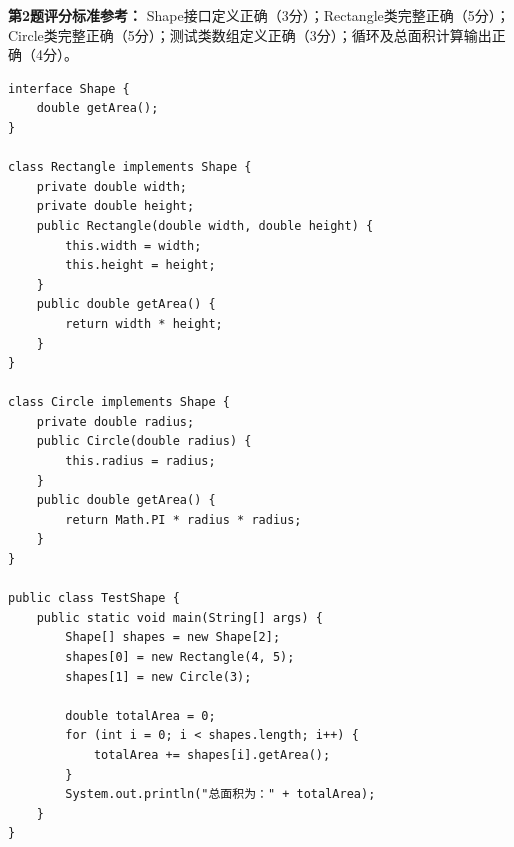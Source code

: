 \documentclass[a3paper, landscape, 11pt, twocolumn]{article}
\begin{document}
\vspace{1em}
\textbf{第2题评分标准参考：}
Shape接口定义正确（3分）；Rectangle类完整正确（5分）；Circle类完整正确（5分）；测试类数组定义正确（3分）；循环及总面积计算输出正确（4分）。
\begin{lstlisting}[style=JavaExam]
interface Shape {
    double getArea();
}

class Rectangle implements Shape {
    private double width;
    private double height;
    public Rectangle(double width, double height) {
        this.width = width;
        this.height = height;
    }
    public double getArea() {
        return width * height;
    }
}

class Circle implements Shape {
    private double radius;
    public Circle(double radius) {
        this.radius = radius;
    }
    public double getArea() {
        return Math.PI * radius * radius;
    }
}

public class TestShape {
    public static void main(String[] args) {
        Shape[] shapes = new Shape[2];
        shapes[0] = new Rectangle(4, 5);
        shapes[1] = new Circle(3);
        
        double totalArea = 0;
        for (int i = 0; i < shapes.length; i++) {
            totalArea += shapes[i].getArea();
        }
        System.out.println("总面积为：" + totalArea);
    }
}
\end{lstlisting}
\end{document}
